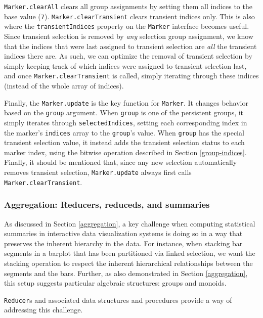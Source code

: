 \documentclass[
  openany]{book}
\theoremstyle{definition}
\theoremstyle{definition}
\theoremstyle{definition}
\theoremstyle{definition}
\theoremstyle{remark}
\begin{document}
\texttt{Marker.clearAll} clears all group assignments by setting them all indices to the base value (\texttt{7}). \texttt{Marker.clearTransient} clears transient indices only. This is also where the \texttt{transientIndices} property on the \texttt{Marker} interface becomes useful. Since transient selection is removed by \emph{any} selection group assignment, we know that the indices that were last assigned to transient selection are \emph{all} the transient indices there are. As such, we can optimize the removal of transient selection by simply keeping track of which indices were assigned to transient selection last, and once \texttt{Marker.clearTransient} is called, simply iterating through these indices (instead of the whole array of indices).

Finally, the \texttt{Marker.update} is the key function for \texttt{Marker}. It changes behavior based on the \texttt{group} argument. When \texttt{group} is one of the persistent groups, it simply iterates through \texttt{selectedIndices}, setting each corresponding index in the marker's \texttt{indices} array to the \texttt{group}'s value. When \texttt{group} has the special transient selection value, it instead adds the transient selection status to each marker index, using the bitwise operation described in Section \ref{group-indices}. Finally, it should be mentioned that, since any new selection automatically removes transient selection, \texttt{Marker.update} always first calls \texttt{Marker.clearTransient}.

\subsubsection{Aggregation: Reducers, reduceds, and summaries}\label{aggregation-summaries}

As discussed in Section \ref{aggregation}, a key challenge when computing statistical summaries in interactive data visualization systems is doing so in a way that preserves the inherent hierarchy in the data. For instance, when stacking bar segments in a barplot that has been partitioned via linked selection, we want the stacking operation to respect the inherent hierarchical relationships between the segments and the bars. Further, as also demonstrated in Section \ref{aggregation}, this setup suggests particular algebraic structures: groups and monoids.

\texttt{Reducer}s and associated data structures and procedures provide a way of addressing this challenge.
\end{document}
